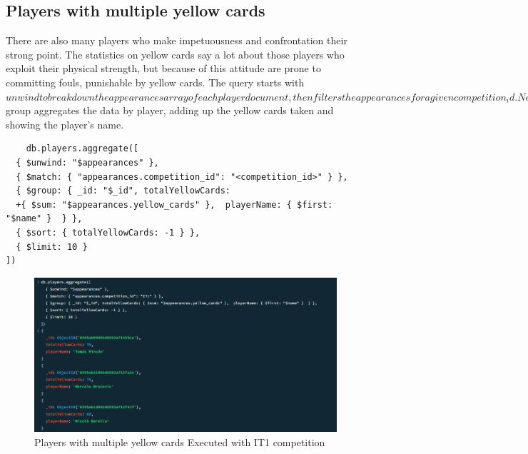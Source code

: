 \documentclass{Configuration_Files/PoliMi3i_thesis}
\begin{document}
\subsection{Players with multiple yellow cards}
There are also many players who make impetuousness and confrontation their strong point. The statistics on yellow cards say a lot about those players who exploit their physical strength, but because of this attitude are prone to committing fouls, punishable by yellow cards. The query starts with $unwind to break down the appearances array of each player document, then filters the appearances for a given competition_id. Next, $group aggregates the data by player, adding up the yellow cards taken and showing the player's name. 
\begin{verbatim}
    db.players.aggregate([
  { $unwind: "$appearances" },
  { $match: { "appearances.competition_id": "<competition_id>" } },
  { $group: { _id: "$_id", totalYellowCards: 
  +{ $sum: "$appearances.yellow_cards" },  playerName: { $first: "$name" }  } },
  { $sort: { totalYellowCards: -1 } },
  { $limit: 10 }
])

\end{verbatim}

\begin{figure}[htbp]
    \centering
    \includegraphics[scale=1]{Images/Queries/Competitions_statistics/yellow-cards/IT1.png}
    \caption{Players with multiple yellow cards Executed with IT1 competition}
\end{figure}
\newpage
\end{document}
